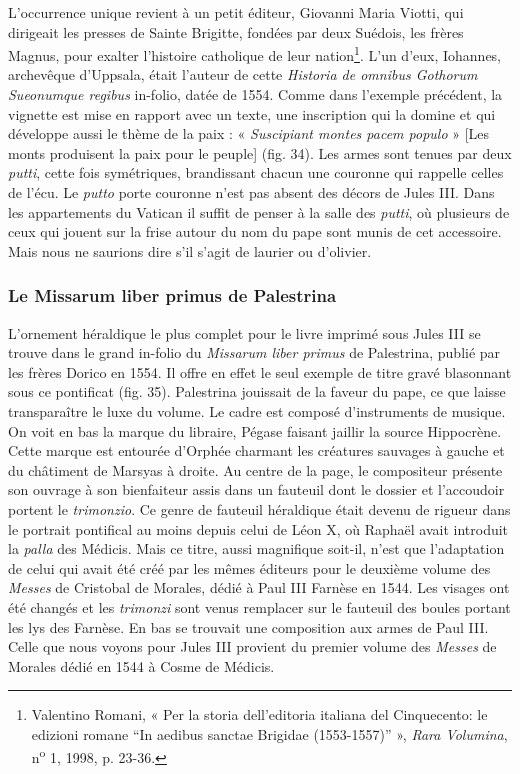 \documentclass[12pt,twoside,openany]{book}
\begin{document}
L’occurrence unique revient à un petit éditeur, Giovanni Maria Viotti, qui dirigeait les presses de Sainte Brigitte, fondées par deux Suédois, les frères Magnus, pour exalter l’histoire catholique de leur nation\footnote{Valentino Romani, « Per la storia dell’editoria italiana del Cinquecento: le edizioni romane “In aedibus sanctae Brigidae (1553-1557)” », \textit{Rara Volumina}, n\textsuperscript{o} 1, 1998, p. 23-36.}. L’un d’eux, Iohannes, archevêque d’Uppsala, était l’auteur de cette \textit{Historia de omnibus Gothorum Sueonumque regibus} in-folio, datée de 1554. Comme dans l’exemple précédent, la vignette est mise en rapport avec un texte, une inscription qui la domine et qui développe aussi le thème de la paix : « \textit{Suscipiant montes pacem populo} » [Les monts produisent la paix pour le peuple] (fig. 34). Les armes sont tenues par deux \textit{putti}, cette fois symétriques, brandissant chacun une couronne qui rappelle celles de l’écu. Le \textit{putto} porte couronne n’est pas absent des décors de Jules III. Dans les appartements du Vatican il suffit de penser à la salle des \textit{putti}, où plusieurs de ceux qui jouent sur la frise autour du nom du pape sont munis de cet accessoire. Mais nous ne saurions dire s’il s’agit de laurier ou d’olivier.

\subsubsection{Le Missarum liber primus de Palestrina}

L’ornement héraldique le plus complet pour le livre imprimé sous Jules III se trouve dans le grand in-folio du \textit{Missarum liber primus} de Palestrina, publié par les frères Dorico en 1554. Il offre en effet le seul exemple de titre gravé blasonnant sous ce pontificat (fig. 35). Palestrina jouissait de la faveur du pape, ce que laisse transparaître le luxe du volume. Le cadre est composé d’instruments de musique. On voit en bas la marque du libraire, Pégase faisant jaillir la source Hippocrène. Cette marque est entourée d’Orphée charmant les créatures sauvages à gauche et du châtiment de Marsyas à droite. Au centre de la page, le compositeur présente son ouvrage à son bienfaiteur assis dans un fauteuil dont le dossier et l’accoudoir portent le \textit{trimonzio}. Ce genre de fauteuil héraldique était devenu de rigueur dans le portrait pontifical au moins depuis celui de Léon X, où Raphaël avait introduit la \textit{palla} des Médicis. Mais ce titre, aussi magnifique soit-il, n’est que l’adaptation de celui qui avait été créé par les mêmes éditeurs pour le deuxième volume des \textit{Messes} de Cristobal de Morales, dédié à Paul III Farnèse en 1544. Les visages ont été changés et les \textit{trimonzi} sont venus remplacer sur le fauteuil des boules portant les lys des Farnèse. En bas se trouvait une composition aux armes de Paul III. Celle que nous voyons pour Jules III provient du premier volume des \textit{Messes} de Morales dédié en 1544 à Cosme de Médicis.
\end{document}
